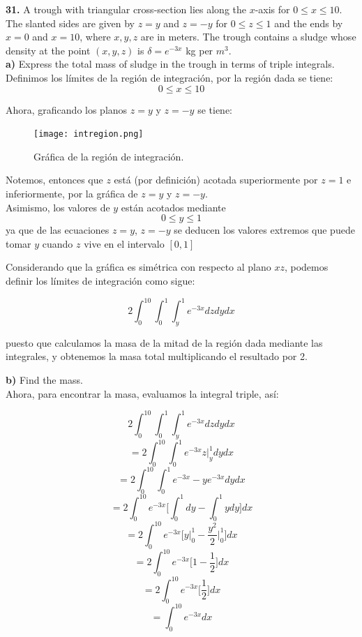 \documentclass[11pt]{report}
\begin{document}
\textbf{31.} A trough with triangular cross-section lies along the $x$-axis for
$0 \leq x \leq 10$. The slanted sides are given by $z = y$ and $z = -y$ for
$0 \leq z \leq 1$ and the ends by $x = 0$ and $x = 10$, where $x, y, z$ are in meters.
The trough contains a sludge whose density at the point $(x, y, z)$ is
$\delta = e^{-3x}$ kg per $m^3$. \\

\textbf{a)} Express the total mass of sludge in the trough in terms of triple
integrals. \\

Definimos los límites de la región de integración, por la región dada se tiene:
	$$ 0 \leq x \leq 10 $$

Ahora, graficando los planos $z = y$ y $z = -y$ se tiene:

\begin{figure}[H]
	\texttt{[image: intregion.png]}
	\centering
	\caption{Gráfica de la región de integración.}
	\centering
\end{figure}

Notemos, entonces que $z$ está (por definición) acotada superiormente por
$z = 1$ e inferiormente, por la gráfica de $z = y$ y $z = -y$.\\

Asimismo, los valores de $y$ están acotados mediante
	$$ 0 \leq y \leq 1$$
ya que de las ecuaciones $z = y$, $z = -y$ se deducen los valores extremos
que puede tomar $y$ cuando $z$ vive en el intervalo $[0,1]$

Considerando que la gráfica es simétrica con respecto al plano $xz$, podemos
definir los límites de integración como sigue:

	$$ 2 \int_{0}^{10}\int_{0}^{1}\int_{y}^{1} e^{-3x} dz dy dx  $$

puesto que calculamos la masa de la mitad de la región dada mediante las integrales,
y obtenemos la masa total multiplicando el resultado por 2.


\textbf{b)} Find the mass. \\

	Ahora, para encontrar la masa, evaluamos la integral triple, así:

	$$ 2 \int_{0}^{10}\int_{0}^{1}\int_{y}^{1} e^{-3x} dz dy dx  $$
	$$ =  2 \int_{0}^{10}\int_{0}^{1} e^{-3x} z \Big|_{y}^{1} dy dx  $$
	$$ =  2 \int_{0}^{10}\int_{0}^{1} e^{-3x} - ye^{-3x}  dy dx  $$
	$$ =  2 \int_{0}^{10} e^{-3x} \Big[\int_{0}^{1} dy - \int_{0}^{1} y dy \Big] dx  $$
	$$ =  2 \int_{0}^{10} e^{-3x} \Big[ y \Big|_{0}^{1} - \frac{y^2}{2} \Big|_{0}^{1} \Big] dx  $$
	$$ =  2 \int_{0}^{10} e^{-3x} \Big[ 1 - \frac{1}{2} \Big] dx  $$
	$$ =  2 \int_{0}^{10} e^{-3x} \Big[ \frac{1}{2} \Big] dx  $$
	$$ =  \int_{0}^{10} e^{-3x} dx  $$
\end{document}
